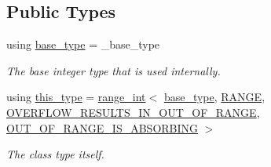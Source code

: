 \subsection*{Public Types}
\begin{DoxyCompactItemize}
\item 
\mbox{\label{classfsl_1_1lg_1_1range__int_a4ce67cd216fd303b7bae83a7cbcab3bb}} 
using \mbox{\hyperlink{classfsl_1_1lg_1_1range__int_a4ce67cd216fd303b7bae83a7cbcab3bb}{base\+\_\+type}} = \+\_\+base\+\_\+type
\begin{DoxyCompactList}\small\item\em The base integer type that is used internally. \end{DoxyCompactList}\item 
\mbox{\label{classfsl_1_1lg_1_1range__int_a169bb31424f54af669b39a96e42dc73f}} 
using \mbox{\hyperlink{classfsl_1_1lg_1_1range__int_a169bb31424f54af669b39a96e42dc73f}{this\+\_\+type}} = \mbox{\hyperlink{classfsl_1_1lg_1_1range__int}{range\+\_\+int}}$<$ \mbox{\hyperlink{classfsl_1_1lg_1_1range__int_a4ce67cd216fd303b7bae83a7cbcab3bb}{base\+\_\+type}}, \mbox{\hyperlink{classfsl_1_1lg_1_1range__int_a438be32af68025525703578ac9fdcd09}{R\+A\+N\+GE}}, \mbox{\hyperlink{classfsl_1_1lg_1_1range__int_a48bbbbf32a26bb023ae20b445f45b1f3}{O\+V\+E\+R\+F\+L\+O\+W\+\_\+\+R\+E\+S\+U\+L\+T\+S\+\_\+\+I\+N\+\_\+\+O\+U\+T\+\_\+\+O\+F\+\_\+\+R\+A\+N\+GE}}, \mbox{\hyperlink{classfsl_1_1lg_1_1range__int_acbf06ac41ab787737c754e77726b7354}{O\+U\+T\+\_\+\+O\+F\+\_\+\+R\+A\+N\+G\+E\+\_\+\+I\+S\+\_\+\+A\+B\+S\+O\+R\+B\+I\+NG}} $>$
\begin{DoxyCompactList}\small\item\em The class type itself. \end{DoxyCompactList}\end{DoxyCompactItemize}
